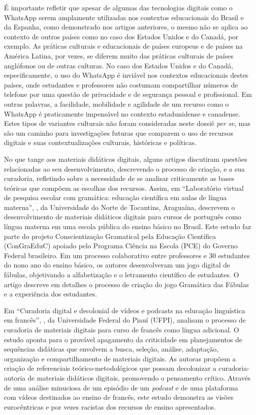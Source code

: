 \documentclass[portuguese]{textolivre}
\begin{document}
É importante refletir que apesar de algumas das tecnologias digitais como o WhatsApp serem amplamente utilizadas nos contextos educacionais do Brasil e da Espanha, como demonstrado nos artigos anteriores, o mesmo não se aplica ao contexto de outros países como no caso dos Estados Unidos e do Canadá, por exemplo. As práticas culturais e educacionais de países europeus e de países na América Latina, por vezes, se diferem muito das práticas culturais de países anglófonos ou de outras culturas. No caso dos Estados Unidos e do Canadá, especificamente, o uso do WhatsApp é inviável nos contextos educacionais destes países, onde estudantes e professores não costumam compartilhar  números de telefone por uma questão de privacidade e de segurança pessoal e profissional. Em outras palavras, a facilidade, mobilidade e agilidade de um recurso como o WhatsApp é praticamente impensável no contexto estadunidense e canadense. Estes tipos de variantes culturais não foram consideradas neste dossiê \emph{per se}, mas são um caminho para investigações futuras que comparem o uso de recursos digitais e suas contextualizações culturais, históricas e políticas.

No que tange aos materiais didáticos digitais, alguns artigos discutiram questões relacionadas ao seu desenvolvimento, descrevendo o processo de criação, e a sua curadoria, refletindo sobre a necessidade de se analisar criticamente as bases teóricas que compõem as escolhas dos recursos. Assim, em “Laboratório virtual de pesquisa escolar com gramática: educação científica em aulas de língua materna”, \textcite{silva_densidade_2024}, da Universidade do Norte de Tocantins, Araguaína, descrevem o desenvolvimento de materiais didáticos digitais para cursos de português como língua materna em uma escola pública do ensino básico no Brasil. Este estudo faz parte do projeto Conscientização Gramatical pela Educação Científica (ConGraEduC) apoiado pelo Programa Ciência na Escola (PCE) do Governo Federal brasileiro. Em um processo colaborativo entre professores e 30 estudantes do nono ano do ensino básico, os autores desenvolveram um jogo digital de fábulas, objetivando a alfabetização e o letramento científico de estudantes. O artigo descreve em detalhes o processo de criação do jogo Gramática das Fábulas e a experiência dos estudantes. 

Em “Curadoria digital e decolonial de vídeos e podcasts na educação linguística em francês”, \textcite{abreu_curadoria_2024}, da Universidade Federal do Piauí (UFPI), analisam o processo de curadoria de materiais digitais para curso de francês como língua adicional. O estudo aponta para o provável apagamento da criticidade em planejamentos de sequências didáticas que envolvem a busca, seleção, análise, adaptação, organização e compartilhamento de materiais digitais. As autoras propõem a criação de referenciais teórico-metodológicos que possam decolonizar a curadoria-autoria de materiais didáticos digitais, promovendo o pensamento crítico. Através de uma análise minuciosa de um episódio de um \textit{podcast} e de uma plataforma com vídeos destinados ao ensino de francês, este estudo demonstra as visões eurocêntricas e por vezes racistas dos recursos de ensino apresentados.
\end{document}
